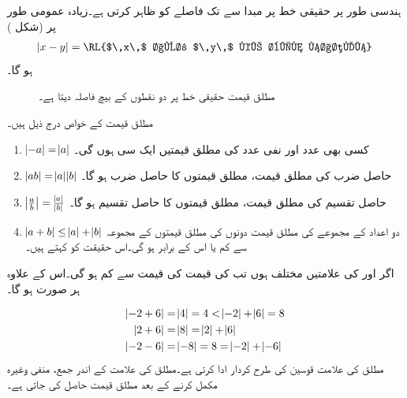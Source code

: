 ہندسی طور پر حقیقی خط پر مبدا  سے  تک فاصلے کو  ظاہر کرتی  ہے۔زیادہ عمومی طور پر (شکل ) 
\begin{align*}
\abs{x-y}=\text{\RL{$\,x\,$ اور $\,y\,$ کے بیچ فاصلہ}}
\end{align*}
ہو گا۔
\begin{figure}
\centering
{}
\caption{مطلق قیمت حقیقی خط پر دو نقطوں کے بیچ فاصلہ دیتا ہے۔}
\label{شکل_ابتدائی_مطلق_جیومیٹریائی_مطلب}
\end{figure}

مطلق قیمت کے خواص درج ذیل ہیں۔
\begin{enumerate}[1.]
\item{$\abs{-a}=\abs{a}$}\quad
کسی بھی عدد اور نفی عدد  کی مطلق قیمتیں ایک سی  ہوں گی۔
\item{$\abs{ab}=\abs{a}\abs{b}$}\quad
حاصل ضرب کی مطلق قیمت، مطلق قیمتوں کا حاصل ضرب ہو گا۔
\item{$\abs{\frac{a}{b}}=\frac{\abs{a}}{\abs{b}}$}\quad
حاصل تقسیم کی مطلق قیمت، مطلق قیمتوں کا حاصل تقسیم ہو گا۔
\item{$\abs{a+b}\le \abs{a}+\abs{b}$}\quad
دو اعداد کے مجموعے  کی مطلق قیمت دونوں کی  مطلق قیمتوں کے مجموعہ سے کم یا اس کے برابر ہو گی۔اس حقیقت  کو  کہتے ہیں۔
\end{enumerate}


اگر  اور  کی علامتیں مختلف ہوں تب  کی قیمت  کی قیمت سے کم ہو گی۔اس کے علاوہ ہر صورت  ہو گا۔

\begin{align*}
\abs{-2+6}&=\abs{4}=4<\abs{-2}+\abs{6}=8\\
\abs{2+6}&=\abs{8}=\abs{2}+\abs{6}\\
\abs{-2-6}&=\abs{-8}=8=\abs{-2}+\abs{-6}
\end{align*}
مطلق کی علامت قوسین کی طرح کردار ادا کرتی ہے۔مطلق کی علامت کے اندر جمع، منفی وغیرہ مکمل کرنے کے بعد مطلق قیمت حاصل کی جاتی ہے۔

